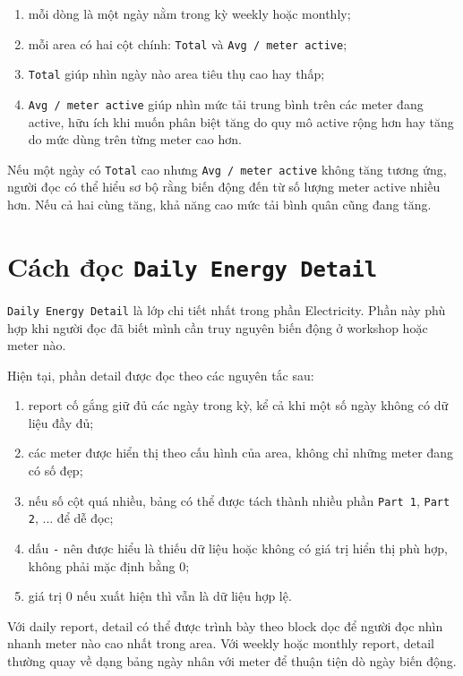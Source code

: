 \begin{enumerate}[label=-]
\item mỗi dòng là một ngày nằm trong kỳ weekly hoặc monthly;
\item mỗi area có hai cột chính: \texttt{Total} và \texttt{Avg / meter active};
\item \texttt{Total} giúp nhìn ngày nào area tiêu thụ cao hay thấp;
\item \texttt{Avg / meter active} giúp nhìn mức tải trung bình trên các meter đang active, hữu ích khi muốn phân biệt tăng do quy mô active rộng hơn hay tăng do mức dùng trên từng meter cao hơn.
\end{enumerate}

Nếu một ngày có \texttt{Total} cao nhưng \texttt{Avg / meter active} không tăng tương ứng, người đọc có thể hiểu sơ bộ rằng biến động đến từ số lượng meter active nhiều hơn. Nếu cả hai cùng tăng, khả năng cao mức tải bình quân cũng đang tăng.

\section{Cách đọc \texttt{Daily Energy Detail}}

\texttt{Daily Energy Detail} là lớp chi tiết nhất trong phần Electricity. Phần này phù hợp khi người đọc đã biết mình cần truy nguyên biến động ở workshop hoặc meter nào.

Hiện tại, phần detail được đọc theo các nguyên tắc sau:

\begin{enumerate}[label=-]
\item report cố gắng giữ đủ các ngày trong kỳ, kể cả khi một số ngày không có dữ liệu đầy đủ;
\item các meter được hiển thị theo cấu hình của area, không chỉ những meter đang có số đẹp;
\item nếu số cột quá nhiều, bảng có thể được tách thành nhiều phần \texttt{Part 1}, \texttt{Part 2}, ... để dễ đọc;
\item dấu \texttt{-} nên được hiểu là thiếu dữ liệu hoặc không có giá trị hiển thị phù hợp, không phải mặc định bằng 0;
\item giá trị 0 nếu xuất hiện thì vẫn là dữ liệu hợp lệ.
\end{enumerate}

Với daily report, detail có thể được trình bày theo block dọc để người đọc nhìn nhanh meter nào cao nhất trong area. Với weekly hoặc monthly report, detail thường quay về dạng bảng ngày nhân với meter để thuận tiện dò ngày biến động.

